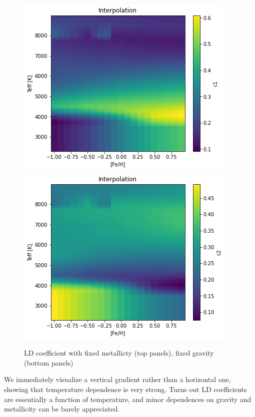 \documentclass{aa}
\begin{document}
\begin{figure}[h]
    \includegraphics[scale=0.4, angle=0]{pictures/2017_c1_fixedg}
    \includegraphics[scale=0.4, angle=0]{pictures/2017_c2_fixedg}
    \caption{LD coefficient with fixed metallicty (top panels), fixed gravity (bottom panels)}
\end{figure}
We immediately visualize a vertical gradient rather than a horizontal one,
showing that temperature dependence is very strong. Turns out LD 
coefficients are essentially a function of temperature, and minor 
dependences on gravity and metallicity can be barely appreciated.
\end{document}
